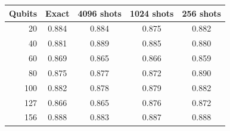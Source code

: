 \begin{tabular}{rcccc}
\toprule
Qubits & Exact & 4096 shots & 1024 shots & 256 shots \\
\midrule
20 & 0.884 & 0.884 & 0.875 & 0.882 \\
40 & 0.881 & 0.889 & 0.885 & 0.880 \\
60 & 0.869 & 0.865 & 0.866 & 0.859 \\
80 & 0.875 & 0.877 & 0.872 & 0.890 \\
100 & 0.882 & 0.878 & 0.879 & 0.882 \\
127 & 0.866 & 0.865 & 0.876 & 0.872 \\
156 & 0.888 & 0.883 & 0.887 & 0.888 \\
\bottomrule
\end{tabular}
